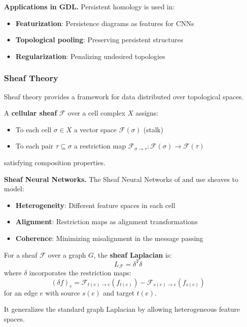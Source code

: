 \textbf{Applications in GDL.}\label{rem:persistencia_gdl} Persistent homology is used in:
\begin{itemize}
    \item \textbf{Featurization}: Persistence diagrams as features for CNNs
    \item \textbf{Topological pooling}: Preserving persistent structures
    \item \textbf{Regularization}: Penalizing undesired topologies
\end{itemize}

\subsubsection{Sheaf Theory}

Sheaf theory provides a framework for data distributed over topological spaces.

\begin{definition}\label{def:sheaf_celular}
A \textbf{cellular sheaf} $\mathcal{F}$ over a cell complex $X$ assigns:
\begin{itemize}
    \item To each cell $\sigma \in X$ a vector space $\mathcal{F}(\sigma)$ (stalk)
    \item To each pair $\tau \subseteq \sigma$ a restriction map $\mathcal{F}_{\sigma \to \tau}: \mathcal{F}(\sigma) \to \mathcal{F}(\tau)$
\end{itemize}
satisfying composition properties.
\end{definition}

\textbf{Sheaf Neural Networks.}\label{rem:sheaf_nns} The Sheaf Neural Networks of \citet{hansen2021sheaf} and \citet{bodnar2023cellular} use sheaves to model:
\begin{itemize}
    \item \textbf{Heterogeneity}: Different feature spaces in each cell
    \item \textbf{Alignment}: Restriction maps as alignment transformations
    \item \textbf{Coherence}: Minimizing misalignment in the message passing
\end{itemize}

\begin{example}\label{ex:sheaf_laplacian}
For a sheaf $\mathcal{F}$ over a graph $G$, the \textbf{sheaf Laplacian} is:
\[L_{\mathcal{F}} = \delta^T \delta\]
where $\delta$ incorporates the restriction maps:
\[(\delta f)_e = \mathcal{F}_{t(e) \to e}(f_{t(e)}) - \mathcal{F}_{s(e) \to e}(f_{s(e)})\]
for an edge $e$ with source $s(e)$ and target $t(e)$.

It generalizes the standard graph Laplacian by allowing heterogeneous feature spaces.
\end{example}

